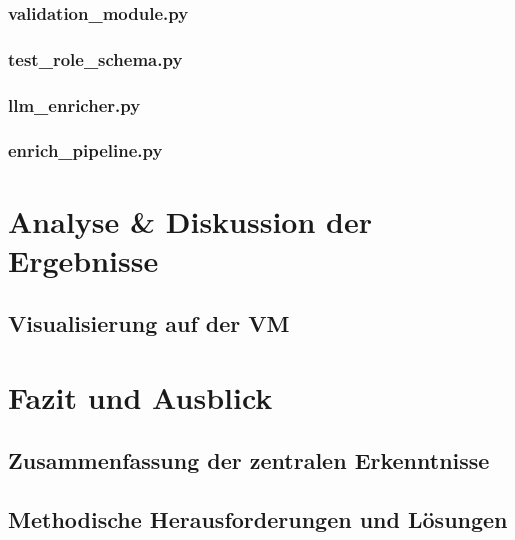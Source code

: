 \documentclass[12pt, a4paper, ngerman, bidi=default]{article}
\begin{document}
\subsubsection{validation\_module.py}
\subsubsection{test\_role\_schema.py}
\subsubsection{llm\_enricher.py}
\subsubsection{enrich\_pipeline.py}


\section{Analyse \& Diskussion der Ergebnisse}
\subsection{Visualisierung auf der VM}

\section{Fazit und Ausblick}
\subsection{Zusammenfassung der zentralen Erkenntnisse}
\subsection{Methodische Herausforderungen und Lösungen}
\end{document}
